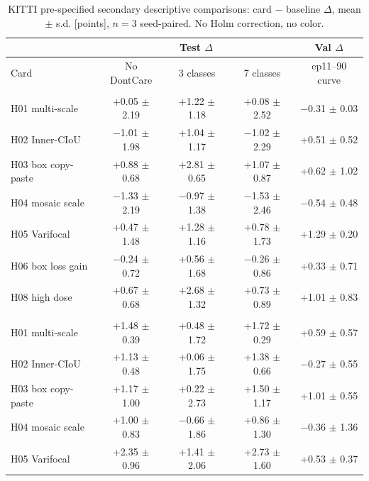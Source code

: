 \begin{table}[!htbp]
\centering\small\setlength{\tabcolsep}{6pt}
\caption{KITTI pre-specified secondary descriptive comparisons: card $-$ baseline $\Delta$, mean $\pm$ s.d. [points], $n=3$ seed-paired. No Holm correction, no color.}\label{tab:kitti-ikincil}
\begin{tabularx}{\textwidth}{>{\raggedright\arraybackslash}X c c c c}
\toprule
\multicolumn{1}{@{}l}{} & \multicolumn{3}{c}{Test $\Delta$} & Val $\Delta$ \\
\cmidrule(lr){2-4}
Card & No DontCare & 3 classes & 7 classes & ep11--90 curve \\
\midrule
\multicolumn{5}{@{}l}{\textbf{YOLO26n}} \\
H01 multi-scale & +0.05 $\pm$ 2.19 & +1.22 $\pm$ 1.18 & +0.08 $\pm$ 2.52 & $-$0.31 $\pm$ 0.03 \\
H02 Inner-CIoU & $-$1.01 $\pm$ 1.98 & +1.04 $\pm$ 1.17 & $-$1.02 $\pm$ 2.29 & +0.51 $\pm$ 0.52 \\
H03 box copy-paste & +0.88 $\pm$ 0.68 & +2.81 $\pm$ 0.65 & +1.07 $\pm$ 0.87 & +0.62 $\pm$ 1.02 \\
H04 mosaic scale & $-$1.33 $\pm$ 2.19 & $-$0.97 $\pm$ 1.38 & $-$1.53 $\pm$ 2.46 & $-$0.54 $\pm$ 0.48 \\
H05 Varifocal & +0.47 $\pm$ 1.48 & +1.28 $\pm$ 1.16 & +0.78 $\pm$ 1.73 & +1.29 $\pm$ 0.20 \\
H06 box loss gain & $-$0.24 $\pm$ 0.72 & +0.56 $\pm$ 1.68 & $-$0.26 $\pm$ 0.86 & +0.33 $\pm$ 0.71 \\
H08 high dose & +0.67 $\pm$ 0.68 & +2.68 $\pm$ 1.32 & +0.73 $\pm$ 0.89 & +1.01 $\pm$ 0.83 \\
\midrule
\multicolumn{5}{@{}l}{\textbf{YOLO11s}} \\
H01 multi-scale & +1.48 $\pm$ 0.39 & +0.48 $\pm$ 1.72 & +1.72 $\pm$ 0.29 & +0.59 $\pm$ 0.57 \\
H02 Inner-CIoU & +1.13 $\pm$ 0.48 & +0.06 $\pm$ 1.75 & +1.38 $\pm$ 0.66 & $-$0.27 $\pm$ 0.55 \\
H03 box copy-paste & +1.17 $\pm$ 1.00 & +0.22 $\pm$ 2.73 & +1.50 $\pm$ 1.17 & +1.01 $\pm$ 0.55 \\
H04 mosaic scale & +1.00 $\pm$ 0.83 & $-$0.66 $\pm$ 1.86 & +0.86 $\pm$ 1.30 & $-$0.36 $\pm$ 1.36 \\
H05 Varifocal & +2.35 $\pm$ 0.96 & +1.41 $\pm$ 2.06 & +2.73 $\pm$ 1.60 & +0.53 $\pm$ 0.37 \\

\end{tabularx}
\end{table}

